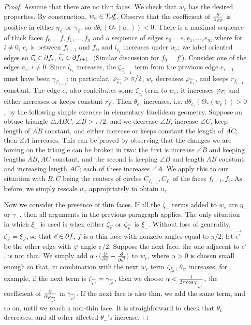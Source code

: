 \begin{proof}
Assume that there are no thin faces.
We check that $w_e$ has the desired properties.
By construction, $w_e \in T_c {\underline{\mathfrak{C}}}$.
Observe that the coefficient of ${\frac{\partial}{\partial \varphi_{\vec{e}}}}$
is positive in either $\eta_{\vec{e}}$ or $\gamma_{\vec{e}}$,
so $d\theta_e(\Theta_*(w_e)) < 0$.
There is a maximal sequence of thick faces
$f_0 = f, f_1, \ldots, f_n$
and a sequence of edges $e_0 = e, e_1, \ldots, e_n$,
where for $i\neq 0$, $e_i$ is between $f_{i-1}$ and $f_i$,
and $l_{e_i}$ increases under $w_e$;
we label oriented edges so $\vec{e_i} \in \partial f_i$,
$\overset{\leftarrow}{e_i} \in \partial f_{i+1}$.
(Similar discussion for $f_0 = f'$).
Consider one of the edges $e_i$, $i\neq 0$.
Since $l_{e_i}$ increases, the $\zeta_{\vec{e}_{i-1}}$ term
from the previous edge $e_{i-1}$ must have been
$\gamma_{\vec{e}_{i-1}}$;
in particular, $\varphi_{\overset{\leftarrow}{e_i}} > \pi/2$,
$w_e$ decreases $\varphi_{\overset{\leftarrow}{e_i}}$,
and keeps $r_{f_{i-1}}$ constant.
The edge $e_i$ also contributes some $\zeta_{\vec{e_i}}$
term to $w_e$;
it increases $\varphi_{\vec{e_i}}$ and either increases
or keeps constant $r_{f_i}$.
Then $\theta_{e_i}$ increases, i.e. $d\theta_{e_i}(\Theta_*(w_e)) > 0$,
by the following simple exercise in elementary Euclidean geometry.
Suppose an obtuse triangle $\triangle ABC$, $\angle B > \pi/2$,
and we decrease $\angle B$, increase $\angle C$,
keep length of $\overline{AB}$ constant,
and either increase or keeps constant the length of $\overline{AC}$;
then $\angle A$ increases.
This can be proved by observing that the changes we are forcing
on the triangle can be broken in two:
the first is increase $\angle B$ and keeping lengths
$\overline{AB}, \overline{AC}$ constant,
and the second is keeping $\angle B$ and length $\overline{AB}$ constant,
and increasing length $\overline{AC}$;
each of these increases $\angle A$.
We apply this to our situation with $B,C$ being
the centers of circles $C_{f_{i-1}}, C_{f_i}$
of the faces $f_{i-1}, f_i$.
As before, we simply rescale $w_e$ appropriately to obtain $u_e$.

Now we consider the presence of thin faces.
If all the $\zeta_-$ terms added to $w_e$
are $\eta_-$ or $\gamma_-$,
then all arguments in the previous paragraph applies.
The only situation in which $\xi_-$ is used
is when either $\zeta_{\vec{e}}$ or $\zeta_{\overset{\leftarrow}{e}}$ is $\xi_-$.
Without loss of generality, $\zeta_{\vec{e}} = \xi_{\vec{e}}$,
so that $\vec{e} \in \partial f$, $f$ is a thin face with nonzero
angles equal to $\pi/2$;
let $\vec{e'}$ be the other edge with $\varphi$ angle $\pi/2$.
Suppose the next face, the one adjacent to $e'$, is not thin.
We simply add $\alpha \cdot ({\frac{\partial}{\partial \vec{e}}} - {\frac{\partial}{\partial \vec{e'}}})$
to $w_e$,
where $\alpha > 0$ is chosen small enough so that, in combination
with the next $w_e$ term $\zeta_{\overset{\leftarrow}{e'}}$,
$\theta_{e'}$ increases;
for example, if the next term is $\zeta_{\overset{\leftarrow}{e'}} = \gamma_{\overset{\leftarrow}{e'}}$,
then we choose $\alpha < \frac{1}{2r \cos \varphi_{\overset{\leftarrow}{e'}}}$,
the coefficient of ${\frac{\partial}{\partial \varphi_{\overset{\leftarrow}{e'}}}}$ in $\gamma_{\overset{\leftarrow}{e'}}$.
If the next face is also thin,
we add the same term, and so on, until we reach a non-thin face.
It is straighforward to check that $\theta_e$ decreases,
and all other affected $\theta_-$'s increase.
\end{proof}



